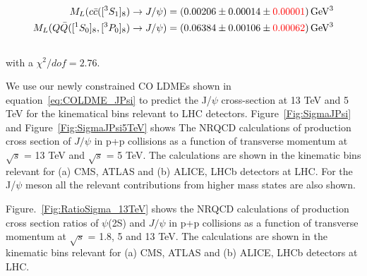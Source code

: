 \documentclass[aps,prc,preprint,superscriptaddress,showpacs,showkeys,amsmath]{revtex4-1}
\begin{document}
\begin{equation}
\begin{split}
M_{L}(c{\bar{c}}([^3S_1]_{8})\rightarrow J/\psi)&= (0.00206\pm 0.00014 \pm {\color{red}0.00001}) \,{\rm GeV^3}\\
 M_{L}(Q{\bar{Q}}([^1S_0]_{8},[^3P_0]_{8})\rightarrow J/\psi)&= (0.06384\pm 0.00106 \pm {\color{red}0.00062}) \,{\rm GeV^3} \\
~\label{eq:COLDME_JPsi}
\end{split}
\end{equation}
with a {\color{red}$\chi^2/dof=2.76$}.

 We use our newly constrained CO LDMEs shown in equation~\ref{eq:COLDME_JPsi} to 
predict the J/$\psi$ cross-section at 13 TeV and 5 TeV for the kinematical 
bins relevant to LHC detectors.     
Figure~\ref{Fig:SigmaJPsi} and Figure~\ref{Fig:SigmaJPsi5TeV} shows The NRQCD 
calculations of production cross section of $J/\psi$ in p+p collisions  
as a function of transverse momentum at $\sqrt{s}$ = 13 TeV and $\sqrt{s}$ = 5 TeV. 
The calculations are shown in the kinematic bins relevant for (a) CMS, ATLAS and 
(b) ALICE, LHCb detectors at LHC. For the J/$\psi$ meson all the relevant contributions 
from higher mass states are also shown. 

  Figure.~\ref{Fig:RatioSigma_13TeV} shows the
NRQCD calculations of production cross section ratios of $\psi$(2S) and $J/\psi$
in p+p collisions as a function of transverse momentum at $\sqrt{s}$ = 1.8, 5 and 13 TeV. 
The calculations are shown in  the kinematic bins relevant for (a) CMS, ATLAS and 
(b) ALICE, LHCb detectors at LHC. 
\end{document}
